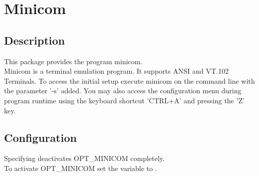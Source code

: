 {
\section {Minicom}
}

\subsection {Description}
  This package provides the program minicom.\\
  Minicom is a terminal emulation program. It supports ANSI and VT.102
  Terminals. To access the initial setup execute minicom on the command
  line with the parameter '-s' added. You may also access the configuration
  menu during program runtime using the keyboard shortcut 'CTRL+A' and
  pressing the 'Z' key.

\subsection{Configuration}

\begin{description}

  Specifying  deactivates OPT\_MINICOM completely.\\
  To activate OPT\_MINICOM set the variable  to
  .

\end{description}
